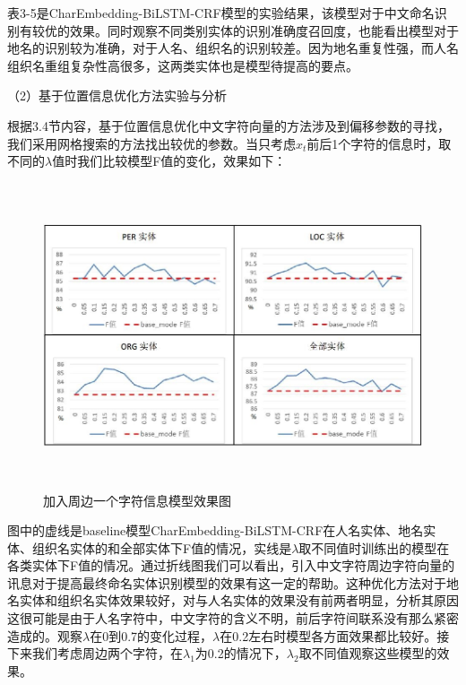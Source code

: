 \documentclass[winfonts,master,oneside,nobackinfo]{njuthesis}
\begin{document}
表3-5是CharEmbedding-BiLSTM-CRF模型的实验结果，该模型对于中文命名识别有较优的效果。同时观察不同类别实体的识别准确度召回度，也能看出模型对于地名的识别较为准确，对于人名、组织名的识别较差。因为地名重复性强，而人名组织名重组复杂性高很多，这两类实体也是模型待提高的要点。



（2）基于位置信息优化方法实验与分析

根据3.4节内容，基于位置信息优化中文字符向量的方法涉及到偏移参数的寻找，我们采用网格搜索的方法找出较优的参数。当只考虑$x_{t}$前后1个字符的信息时，取不同的$\lambda$值时我们比较模型F值的变化，效果如下：

\begin{figure}[H]
\centering
\begin{minipage}[t]{\textwidth}
\includegraphics[width=1\textwidth,height=9cm]{./figure/参数1.jpg}
\caption{加入周边一个字符信息模型效果图}
\label{lab:1}
\end{minipage}
\end{figure}

图中的虚线是baseline模型CharEmbedding-BiLSTM-CRF在人名实体、地名实体、组织名实体的和全部实体下F值的情况，实线是$\lambda$取不同值时训练出的模型在各类实体下F值的情况。通过折线图我们可以看出，引入中文字符周边字符向量的讯息对于提高最终命名实体识别模型的效果有这一定的帮助。这种优化方法对于地名实体和组织名实体效果较好，对与人名实体的效果没有前两者明显，分析其原因这很可能是由于人名字符中，中文字符的含义不明，前后字符间联系没有那么紧密造成的。观察$\lambda$在0到0.7的变化过程，$\lambda$在0.2左右时模型各方面效果都比较好。接下来我们考虑周边两个字符，在$\lambda_{1}$为0.2的情况下，$\lambda_{2}$取不同值观察这些模型的效果。
\end{document}
